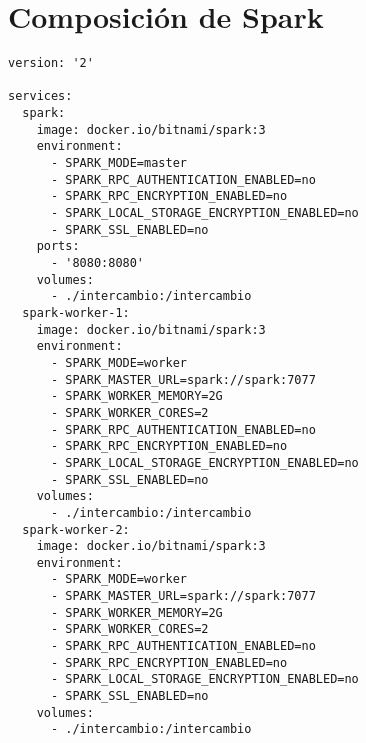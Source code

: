 \chapter{Composición de Spark}
\begin{verbatim}
version: '2'

services:
  spark:
    image: docker.io/bitnami/spark:3
    environment:
      - SPARK_MODE=master
      - SPARK_RPC_AUTHENTICATION_ENABLED=no
      - SPARK_RPC_ENCRYPTION_ENABLED=no
      - SPARK_LOCAL_STORAGE_ENCRYPTION_ENABLED=no
      - SPARK_SSL_ENABLED=no
    ports:
      - '8080:8080'
    volumes:
      - ./intercambio:/intercambio
  spark-worker-1:
    image: docker.io/bitnami/spark:3
    environment:
      - SPARK_MODE=worker
      - SPARK_MASTER_URL=spark://spark:7077
      - SPARK_WORKER_MEMORY=2G
      - SPARK_WORKER_CORES=2
      - SPARK_RPC_AUTHENTICATION_ENABLED=no
      - SPARK_RPC_ENCRYPTION_ENABLED=no
      - SPARK_LOCAL_STORAGE_ENCRYPTION_ENABLED=no
      - SPARK_SSL_ENABLED=no
    volumes:
      - ./intercambio:/intercambio
  spark-worker-2:
    image: docker.io/bitnami/spark:3
    environment:
      - SPARK_MODE=worker
      - SPARK_MASTER_URL=spark://spark:7077
      - SPARK_WORKER_MEMORY=2G
      - SPARK_WORKER_CORES=2
      - SPARK_RPC_AUTHENTICATION_ENABLED=no
      - SPARK_RPC_ENCRYPTION_ENABLED=no
      - SPARK_LOCAL_STORAGE_ENCRYPTION_ENABLED=no
      - SPARK_SSL_ENABLED=no
    volumes:
      - ./intercambio:/intercambio


\end{verbatim}